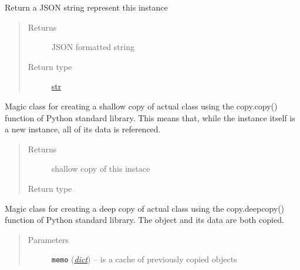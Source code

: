 \documentclass[letterpaper,10pt,english]{sphinxmanual}
\begin{document}
\begin{fulllineitems}

\begin{fulllineitems}
\label{util/nffg:escape.util.nffg.AbstractNFFG.to_json}
Return a JSON string represent this instance
\begin{quote}\begin{description}
\item[{Returns}] \leavevmode
JSON formatted string

\item[{Return type}] \leavevmode
\href{https://docs.python.org/2.7/library/functions.html\#str}{str}

\end{description}\end{quote}

\end{fulllineitems}


\begin{fulllineitems}
\label{util/nffg:escape.util.nffg.AbstractNFFG.__copy__}
Magic class for creating a shallow copy of actual class using the
copy.copy() function of Python standard library. This means that,
while the instance itself is a new instance, all of its data is referenced.
\begin{quote}\begin{description}
\item[{Returns}] \leavevmode
shallow copy of this instace

\item[{Return type}] \leavevmode
{\hyperref[util/nffg:escape.util.nffg.NFFG]{\emph{}}}

\end{description}\end{quote}

\end{fulllineitems}


\begin{fulllineitems}
\label{util/nffg:escape.util.nffg.AbstractNFFG.__deepcopy__}
Magic class for creating a deep copy of actual class using the
copy.deepcopy() function of Python standard library. The object and its
data are both copied.
\begin{quote}\begin{description}
\item[{Parameters}] \leavevmode
\textbf{\texttt{memo}} (\href{https://docs.python.org/2.7/library/stdtypes.html\#dict}{\emph{dict}}) -- is a cache of previously copied objects


\end{description}
\end{quote}
\end{fulllineitems}
\end{fulllineitems}
\end{document}
